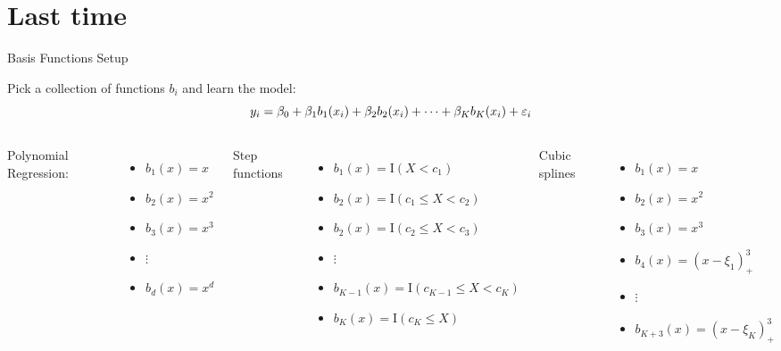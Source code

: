 \documentclass[aspectratio=169,usenames,dvipsnames]{beamer}
\begin{document}
\section{Last time}

\begin{frame}[t]{Basis Functions Setup}

Pick a collection of functions $b_i$ and learn the model:
\begin{equation*}
	y_i = \beta_0 + \beta_1b_1(x_i) + \beta_2 b_2(x_i) + \cdots + \beta_K b_K(x_i) + \varepsilon_i
\end{equation*}

\begin{columns}
\centering
Polynomial Regression:
\footnotesize
	\begin{itemize}
		\item $b_1(x) = x$
		\item $b_2(x) = x^2$
		\item $b_3(x) = x^3$
		\item $\vdots$
		\item $b_d(x) = x^d$
	\end{itemize}


\centering
Step functions
\footnotesize
	\begin{itemize}
		\item $b_1(x) = \mathrm{I}(X<c_1)$
		\item $b_2(x) = \mathrm{I}(c_1 \leq X < c_2)$
		\item $b_2(x) = \mathrm{I}(c_2 \leq X < c_3)$
		\item $\vdots $
		\item $b_{K-1}(x) = \mathrm{I}(c_{K-1} \leq X < c_K)$
		\item $b_K(x) = \mathrm{I}(c_K \leq X)$

	\end{itemize}



\centering
Cubic splines
\footnotesize
	\begin{itemize}
		\item $b_1(x) = x$
		\item $b_2(x) = x^2$
		\item $b_3(x) = x^3$
		\item $b_4(x) = (x-\xi_1)^3_+$
		\item $\vdots$
		\item $b_{K+3}(x) = (x-\xi_K)^3_+$



\end{itemize}
\end{columns}
\end{frame}
\end{document}
